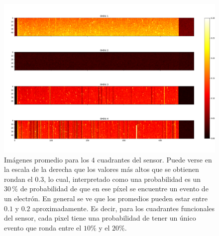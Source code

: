 \begin{figure}[h]
    \centering
    \includegraphics[scale=0.4]{Figs/1ePromedio.pdf}
    \caption{\footnotesize{Imágenes promedio para los $4$ cuadrantes del sensor. Puede verse en la escala de la derecha que los valores más altos que se obtienen rondan el $0.3$, lo cual, interpretado como una probabilidad es un $30\,\%$ de probabilidad de que en ese píxel se encuentre un evento de un electrón. En general se ve que los promedios pueden estar entre $0.1$ y $0.2$ aproximadamente. Es decir, para los cuadrantes funcionales del sensor, cada pixel tiene una probabilidad de tener un único evento que ronda entre el $10\%$ y el $20\%$.}}
    \label{fig:Eventos1e}
\end{figure}
